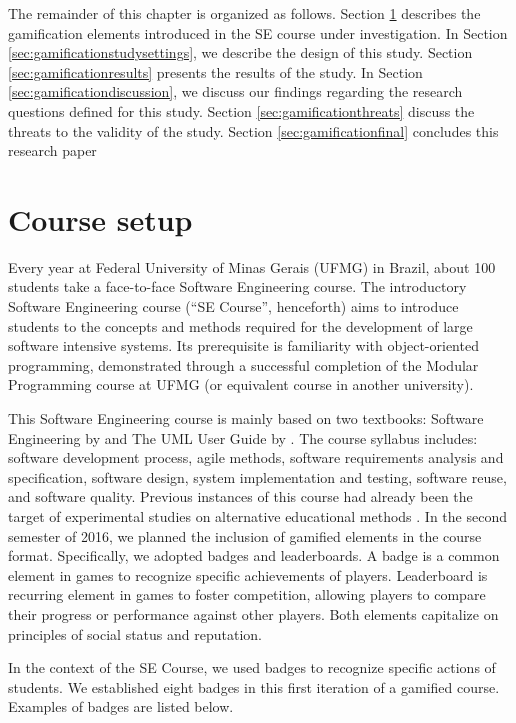 The remainder of this chapter is organized as follows. Section \ref{sec:gamificationcoursesetup} describes the gamification elements introduced in the SE course under investigation. In Section \ref{sec:gamificationstudysettings}, we describe the design of this study. Section \ref{sec:gamificationresults} presents the results of the study. In Section \ref{sec:gamificationdiscussion}, we discuss our findings regarding the research questions defined for this study. Section \ref{sec:gamificationthreats} discuss the threats to the validity of the study. Section \ref{sec:gamificationfinal} concludes this research paper

\section{Course setup}
\label{sec:gamificationcoursesetup}

Every year at Federal University of Minas Gerais (UFMG) in Brazil, about 100 students take a face-to-face Software Engineering course. The introductory Software Engineering course (“SE Course”, henceforth) aims to introduce students to the concepts and methods required for the development of large software intensive systems. Its prerequisite is familiarity with object-oriented programming, demonstrated through a successful completion of the Modular Programming course at UFMG (or equivalent course in another university).

This Software Engineering course is mainly based on two textbooks: Software Engineering by \cite{Sommerville:2010} and The UML User Guide by \cite{Booch:2005}. The course syllabus includes: software development process, agile methods, software requirements analysis and specification, software design, system implementation and testing, software reuse, and software quality.
Previous instances of this course had already been the target of experimental studies on alternative educational methods \citep{Figueiredo:2014, Fernandes:2016}. In the second semester of 2016, we planned the inclusion of gamified elements in the course format. Specifically, we adopted badges and leaderboards. A badge is a common element in games to recognize specific achievements of players. Leaderboard is recurring element in games to foster competition, allowing players to compare their progress or performance against other players. Both elements capitalize on principles of social status and reputation.

In the context of the SE Course, we used badges to recognize specific actions of students. We established eight badges in this first iteration of a gamified course. Examples of badges are listed below.

